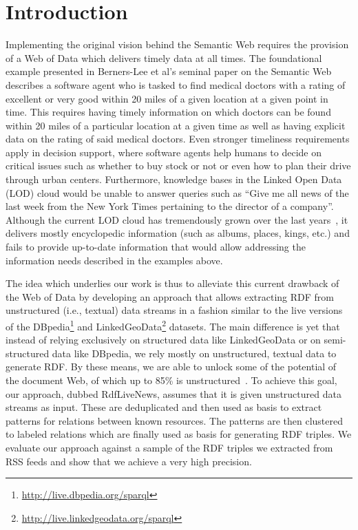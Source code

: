 \documentclass[a4paper]{llncs}
\begin{document}
\section{Introduction}
Implementing the original vision behind the Semantic Web requires the provision of a Web of Data which delivers timely data at all times. 
The foundational example presented in Berners-Lee et al's seminal paper on the Semantic Web~\cite{bernerslee2001semantic} describes a software agent who is tasked to find medical doctors with a rating of excellent or very good within 20 miles of a given location at a given point in time.
This requires having timely information on which doctors can be found within 20 miles of a particular location at a given time as well as having explicit data on the rating of said medical doctors.
Even stronger timeliness requirements apply in decision support, where software agents help humans to decide on critical issues such as whether to buy stock or not or even how to plan their drive through urban centers. 
Furthermore, knowledge bases in the Linked Open Data (LOD) cloud would be unable to answer queries such as ``Give me all news of the last week from the New York Times pertaining to the director of a company''.
Although the current LOD cloud has tremendously grown over the last years~\cite{AUE+11}, it delivers mostly encyclopedic information (such as albums, places, kings, etc.) and fails to provide up-to-date information that would allow addressing the information needs described in the examples above.
 
The idea which underlies our work is thus to alleviate this current drawback of the Web of Data by developing an approach that allows extracting RDF from unstructured (i.e., textual) data streams in a fashion similar to the live versions of the DBpedia\footnote{\url{http://live.dbpedia.org/sparql}} and LinkedGeoData\footnote{\url{http://live.linkedgeodata.org/sparql}} datasets. 
The main difference is yet that instead of relying exclusively on structured data like LinkedGeoData or on semi-structured data like DBpedia, we rely mostly on unstructured, textual data to generate RDF.
By these means, we are able to unlock some of the potential of the document Web, of which up to 85\% is unstructured~\cite{GAA+09}.
To achieve this goal, our approach, dubbed RdfLiveNews, assumes that it is given unstructured data streams as input.
These are deduplicated and then used as basis to extract patterns for relations between known resources.
The patterns are then clustered to labeled relations which are finally used as basis for generating RDF triples.
We evaluate our approach against a sample of the RDF triples we extracted from RSS feeds and show that we achieve a very high precision.
\end{document}
